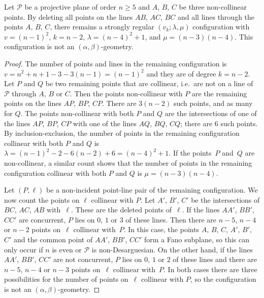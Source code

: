 \documentclass[10pt,a4paper]{amsart}
\def\P{\mathcal{P}}
\begin{document}
\begin{theorem}\label{triangle}
Let $\P$ be a projective plane of order $n\ge 5$ and $A$, $B$, $C$
be three non-collinear points. By deleting all points on the lines
$AB$, $AC$, $BC$ and all lines through the points $A$, $B$, $C$, there
remains a strongly regular $(v_k;\lambda,\mu)$ configuration with $v=(n-1)^2$, $k=n-2$,
$\lambda=(n-4)^2+1$, and $\mu=(n-3)(n-4)$. This configuration is not an
$(\alpha,\beta)$-geometry.
\end{theorem}

\begin{proof}
The number of points and lines in the remaining configuration is
$v=n^2+n+1-3-3(n-1)=(n-1)^2$ and they are of degree $k=n-2$. Let
$P$ and $Q$ be two remaining points that are collinear, i.e.\
are not on a line of $\P$ through $A$, $B$ or $C$. Then the points
non-collinear with $P$ are the remaining points on the
lines $AP$, $BP$, $CP$. There are $3(n-2)$ such points, and as many
for $Q$. The points non-collinear with both $P$ and $Q$ are
the intersections of one of the lines $AP$, $BP$, $CP$ with one of
the lines $AQ$, $BQ$, $CQ$; there are $6$ such points. By
inclusion-exclusion, the number of points in the remaining
configuration collinear with both $P$ and $Q$ is $\lambda=(n-1)^2-2
-6(n-2)+6=(n-4)^2+1$. If the points~$P$ and~$Q$
are non-collinear, a similar count shows that the number of
points in the remaining configuration collinear with both $P$ and $Q$ is
$\mu=(n-3)(n-4)$.

Let $(P,\ell)$ be a non-incident point-line pair of the remaining
configuration. We now count the points on $\ell$ collinear with $P$.
Let $A'$, $B'$, $C'$ be the intersections of $BC$, $AC$, $AB$ with~$\ell$.
These are the deleted points of~$\ell$. If the lines $AA'$, $BB'$, $CC'$
are concurrent, $P$ lies on $0$, $1$ or $3$ of these lines. Then there are
$n-5$, $n-4$ or $n-2$ points on~$\ell$ collinear with~$P$. In this case, the points
$A$, $B$, $C$, $A'$, $B'$, $C'$ and the common point of $AA'$, $BB'$, $CC'$
form a Fano subplane, so this can only occur if $n$ is even or $\P$ is non-Desarguesian.
On the other hand, if the lines $AA'$, $BB'$, $CC'$
are not concurrent, $P$ lies on $0$, $1$ or $2$ of these lines and there are
$n-5$, $n-4$ or $n-3$ points on~$\ell$ collinear with~$P$. In both cases there are three
possibilities for the number of points on~$\ell$ collinear with $P$, so the configuration
is not an $(\alpha,\beta)$-geometry.
\end{proof}
\end{document}
